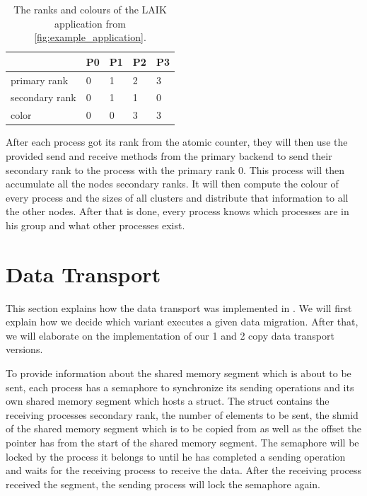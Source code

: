 \begin{table}[htpb]
	\centering
	\begin{tabular}{l l l l l}
		\toprule
		               & P0 & P1 & P2 & P3 \\
		\midrule
		primary rank   & 0  & 1  & 2 & 3   \\
		secondary rank & 0  & 1  & 1 & 0   \\
		color          & 0  & 0  & 3 & 3   \\
		\bottomrule	
	\end{tabular}
	\caption[Values of the example LAIK application]{The ranks and colours of the LAIK application from \autoref{fig:example_application}.}
	\label{tab:ranks_and_colours}
\end{table}

After each process got its rank from the atomic counter, they will then use the provided send and receive methods from the primary backend to send their secondary rank to the process with the primary rank 0.
This process will then accumulate all the nodes secondary ranks.
It will then compute the colour of every process and the sizes of all clusters and distribute that information to all the other nodes.
After that is done, every process knows which processes are in his group and what other processes exist.

\section{Data Transport}\label{section:data_transport}

This section explains how the data transport was implemented in .
We will first explain how we decide which variant executes a given data migration.
After that, we will elaborate on the implementation of our 1 and 2 copy data transport versions.

To provide information about the shared memory segment which is about to be sent, each process has a semaphore to synchronize its sending operations and its own shared memory segment which hosts a  struct.
The  struct contains the receiving processes secondary rank, the number of elements to be sent, the shmid of the shared memory segment which is to be copied from as well as the offset the pointer has from the start of the shared memory segment.
The semaphore will be locked by the process it belongs to until he has completed a sending operation and waits for the receiving process to receive the data.
After the receiving process received the segment, the sending process will lock the semaphore again.

